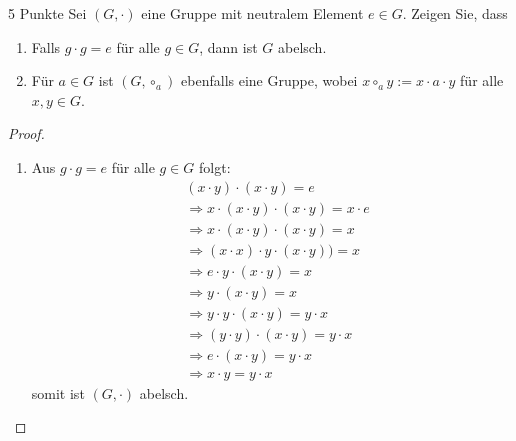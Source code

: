 \documentclass{problemset}
\begin{document}
\begin{problem} {5 Punkte}
Sei $(G, \cdot)$ eine Gruppe mit neutralem Element $e \in G$. Zeigen Sie, dass
\begin{enumerate}
    \item Falls $g \cdot g = e$ für alle $g \in G$, dann ist $G$ abelsch.
    \item Für $a \in G$ ist $(G, \circ_a)$ ebenfalls eine Gruppe, wobei $x \circ_a y := x
              \cdot a \cdot y$ für alle $x, y \in G$.
\end{enumerate}
\begin{proof}
    $ $

    \begin{enumerate}
        \item Aus $g \cdot g = e$ für alle $g \in G$ folgt: \begin{align*}
                   & (x \cdot y) \cdot (x \cdot y) = e \tag{$x \cdot y \in G \Longrightarrow \exists g \in G: g \cdot g = e$} \\
                   & \Longrightarrow x \cdot (x \cdot y) \cdot (x \cdot y) = x \cdot e                                        \\
                   & \Longrightarrow x \cdot (x \cdot y) \cdot (x \cdot y) = x                                                \\
                   & \Longrightarrow (x \cdot x) \cdot y \cdot (x \cdot y)) = x                                               \\
                   & \Longrightarrow e \cdot y \cdot (x \cdot y) = x                                                          \\
                   & \Longrightarrow y \cdot (x \cdot y) = x                                                                  \\
                   & \Longrightarrow y \cdot y \cdot (x \cdot y) = y \cdot x                                                  \\
                   & \Longrightarrow (y \cdot y) \cdot (x \cdot y) = y \cdot x                                                \\
                   & \Longrightarrow e \cdot (x \cdot y) = y \cdot x                                                          \\
                   & \Longrightarrow x \cdot y = y \cdot x
              \end{align*}
              somit ist $(G, \cdot)$ abelsch. \checkmark


\end{enumerate}
\end{proof}
\end{problem}
\end{document}
